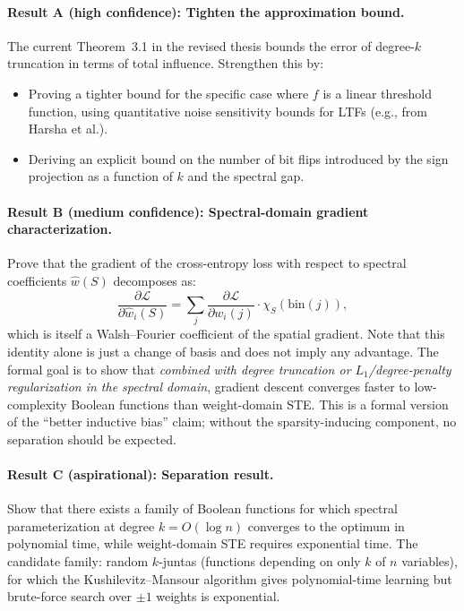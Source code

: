 \documentclass[12pt,a4paper]{article}
\begin{document}
\paragraph{Result A (high confidence): Tighten the approximation bound.}
The current Theorem~3.1 in the revised thesis bounds the error of degree-$k$ truncation in terms of total influence. Strengthen this by:
\begin{itemize}
    \item Proving a tighter bound for the specific case where $f$ is a linear threshold function, using quantitative noise sensitivity bounds for LTFs (e.g., from Harsha et al.).
    \item Deriving an explicit bound on the number of bit flips introduced by the sign projection as a function of $k$ and the spectral gap.
\end{itemize}

\paragraph{Result B (medium confidence): Spectral-domain gradient characterization.}
Prove that the gradient of the cross-entropy loss with respect to spectral coefficients $\hat{w}(S)$ decomposes as:
\[
\frac{\partial \mathcal{L}}{\partial \hat{w}_i(S)} = \sum_j \frac{\partial \mathcal{L}}{\partial w_i(j)} \cdot \chi_S(\text{bin}(j)),
\]
which is itself a Walsh--Fourier coefficient of the spatial gradient. Note that this identity alone is just a change of basis and does not imply any advantage. The formal goal is to show that \emph{combined with degree truncation or $L_1$/degree-penalty regularization in the spectral domain}, gradient descent converges faster to low-complexity Boolean functions than weight-domain STE. This is a formal version of the ``better inductive bias'' claim; without the sparsity-inducing component, no separation should be expected.

\paragraph{Result C (aspirational): Separation result.}
Show that there exists a family of Boolean functions for which spectral parameterization at degree $k = O(\log n)$ converges to the optimum in polynomial time, while weight-domain STE requires exponential time. The candidate family: random $k$-juntas (functions depending on only $k$ of $n$ variables), for which the Kushilevitz--Mansour algorithm gives polynomial-time learning but brute-force search over $\pm 1$ weights is exponential.
\end{document}
